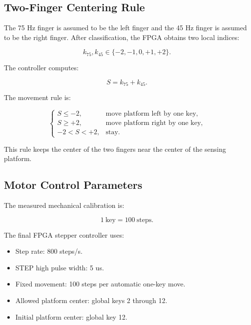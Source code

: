 \subsection{Two-Finger Centering Rule}

The 75 Hz finger is assumed to be the left finger and the 45 Hz finger is assumed to be the right finger. After classification, the FPGA obtains two local indices:

\begin{equation}
    k_{75}, k_{45} \in \{-2,-1,0,+1,+2\}.
\end{equation}

The controller computes:

\begin{equation}
    S = k_{75} + k_{45}.
\end{equation}

The movement rule is:

\begin{equation}
\begin{cases}
    S \le -2, & \text{move platform left by one key}, \\
    S \ge +2, & \text{move platform right by one key}, \\
    -2 < S < +2, & \text{stay}.
\end{cases}
\end{equation}

This rule keeps the center of the two fingers near the center of the sensing platform.

\subsection{Motor Control Parameters}

The measured mechanical calibration is:

\begin{equation}
    1~\mathrm{key} = 100~\mathrm{steps}.
\end{equation}

The final FPGA stepper controller uses:

\begin{itemize}
    \item Step rate: 800 steps/s.
    \item STEP high pulse width: 5 us.
    \item Fixed movement: 100 steps per automatic one-key move.
    \item Allowed platform center: global keys 2 through 12.
    \item Initial platform center: global key 12.
\end{itemize}

